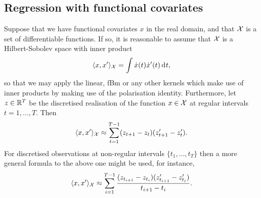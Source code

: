 \subsection{Regression with functional covariates}
\label{sec:regfunctionalcov}

Suppose that we have functional covariates $x$ in the real domain, and that ${\mathcal X}$ is a set of differentiable functions.
If so, it is reasonable to assume that ${\mathcal X}$ is a Hilbert-Sobolev space with inner product
%
\[
  \langle x,x' \rangle_{\mathcal X} = \int \dot{x}(t) \dot{x}'(t) \operatorname{d}\hspace{0.5pt}\! t,
\]
%
so that we may apply the linear, fBm or any other kernels which make use of inner products by making use of the polarisation identity.
Furthermore, let $z \in \mathbb{R}^T$ be the discretised realisation of the function $x \in {\mathcal X}$ at regular intervals $t = 1,\dots,T$. Then
%
\[
  \langle x,x' \rangle_{\mathcal X} \approx \sum_{t=1}^{T-1} (z_{t+1} - z_t)(z'_{t+1} - z_t').
\]
%
For discretised observations at non-regular intervals $\{t_1,\dots,t_T\}$ then a more general formula to the above one might be used, for instance,
\[
  \langle x,x' \rangle_{\mathcal X} \approx \sum_{i=1}^{T-1} \frac{(z_{t_{i+1}} - z_{t_i})(z'_{t_{i+1}} - z_{t_i}')}{t_{i+1} - t_{i}}.
\]

%





